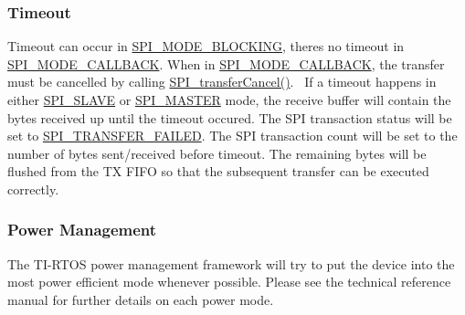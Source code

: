 \subsubsection*{Timeout}

Timeout can occur in \hyperlink{_s_p_i_8h_ab9ea76c6529d6076eee5e1c4a5a92c6fa0dfb2358e008316426895e7237c398e8}{S\+P\+I\+\_\+\+M\+O\+D\+E\+\_\+\+B\+L\+O\+C\+K\+I\+N\+G}, there\textquotesingle{}s no timeout in \hyperlink{_s_p_i_8h_ab9ea76c6529d6076eee5e1c4a5a92c6fa5631e69925c47a62a261c78ebbda39fb}{S\+P\+I\+\_\+\+M\+O\+D\+E\+\_\+\+C\+A\+L\+L\+B\+A\+C\+K}. When in \hyperlink{_s_p_i_8h_ab9ea76c6529d6076eee5e1c4a5a92c6fa5631e69925c47a62a261c78ebbda39fb}{S\+P\+I\+\_\+\+M\+O\+D\+E\+\_\+\+C\+A\+L\+L\+B\+A\+C\+K}, the transfer must be cancelled by calling \hyperlink{_s_p_i_8h_a6819f7761fc3505c4f885653ff8121f0}{S\+P\+I\+\_\+transfer\+Cancel()}.~\newline
If a timeout happens in either \hyperlink{_s_p_i_8h_a60a7e3d74577b38aa79ea6983362f942abc98c1546fe12d3fceb1f86cf670faa9}{S\+P\+I\+\_\+\+S\+L\+A\+V\+E} or \hyperlink{_s_p_i_8h_a60a7e3d74577b38aa79ea6983362f942a84379dc90398ca075038c8d5ee465f6a}{S\+P\+I\+\_\+\+M\+A\+S\+T\+E\+R} mode, the receive buffer will contain the bytes received up until the timeout occured. The S\+P\+I transaction status will be set to \hyperlink{_s_p_i_8h_a913c57c335166de9caa54b7eb9ad95fbac01b83da31c34da13025a5b987ef013f}{S\+P\+I\+\_\+\+T\+R\+A\+N\+S\+F\+E\+R\+\_\+\+F\+A\+I\+L\+E\+D}. The S\+P\+I transaction count will be set to the number of bytes sent/received before timeout. The remaining bytes will be flushed from the T\+X F\+I\+F\+O so that the subsequent transfer can be executed correctly.

\subsubsection*{Power Management}

The T\+I-\/\+R\+T\+O\+S power management framework will try to put the device into the most power efficient mode whenever possible. Please see the technical reference manual for further details on each power mode.

